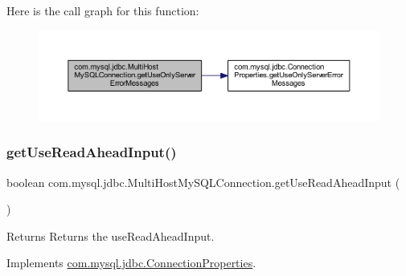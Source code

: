 Here is the call graph for this function\+:
\nopagebreak
\begin{figure}[H]
\begin{center}
\leavevmode
\includegraphics[width=350pt]{classcom_1_1mysql_1_1jdbc_1_1_multi_host_my_s_q_l_connection_a705ba324a046fb764066a5db3e967c47_cgraph}
\end{center}
\end{figure}
\mbox{\label{classcom_1_1mysql_1_1jdbc_1_1_multi_host_my_s_q_l_connection_a06e5584ec8ed2f0025af2929d47cfe34}} 
\subsubsection{\texorpdfstring{get\+Use\+Read\+Ahead\+Input()}{getUseReadAheadInput()}}
{\footnotesize\ttfamily boolean com.\+mysql.\+jdbc.\+Multi\+Host\+My\+S\+Q\+L\+Connection.\+get\+Use\+Read\+Ahead\+Input (\begin{DoxyParamCaption}{ }\end{DoxyParamCaption})}

\begin{DoxyReturn}{Returns}
Returns the use\+Read\+Ahead\+Input. 
\end{DoxyReturn}


Implements \mbox{\hyperlink{interfacecom_1_1mysql_1_1jdbc_1_1_connection_properties_abad9605452003baa9e6841a990334c92}{com.\+mysql.\+jdbc.\+Connection\+Properties}}.

